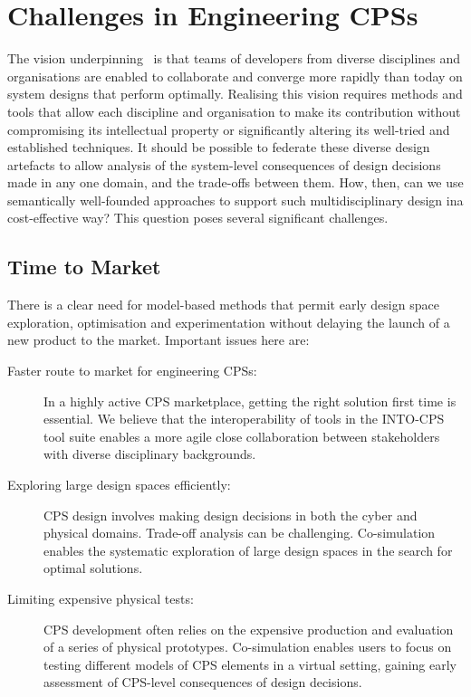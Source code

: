 \section{Challenges in Engineering CPSs}\label{sec:challenges}


The vision underpinning \into\ is that teams of developers from diverse disciplines and organisations are enabled to collaborate and converge more rapidly than today on system designs that perform optimally. Realising this vision requires methods and tools that allow each discipline and organisation to make its contribution without compromising its intellectual property or significantly altering its well-tried and established techniques. It should be possible to federate these diverse design artefacts to allow analysis of the system-level consequences of design decisions made in any one domain, and the trade-offs between them. How, then, can we use semantically well-founded approaches to support such multidisciplinary design ina cost-effective way? This question poses several significant challenges. 

\subsection{Time to Market}

There is a clear need for model-based methods that permit early design space exploration, optimisation and experimentation without delaying the launch of a new product to the market. Important issues here are:

\begin{description}
\item[Faster route to market for engineering CPSs:] In a highly active CPS marketplace, getting the right solution first time is essential. We believe that the interoperability of tools in the INTO-CPS tool suite enables a more agile close collaboration between stakeholders with diverse disciplinary backgrounds.
\item[Exploring large design spaces efficiently:] CPS design involves making design decisions in both the cyber and physical domains. Trade-off analysis can be challenging. Co-simulation enables the systematic exploration of large design spaces in the search for optimal solutions.
\item[Limiting expensive physical tests:] CPS development often relies on the expensive production and evaluation of a series of physical prototypes. Co-simulation enables users to focus on testing different models of CPS elements in a virtual setting, gaining early assessment of CPS-level consequences of design decisions.
\end{description}

